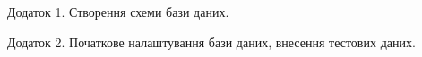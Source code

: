 \newpage
{}

Додаток 1. Створення схеми бази даних.


Додаток 2. Початкове налаштування бази даних, внесення тестових даних.
